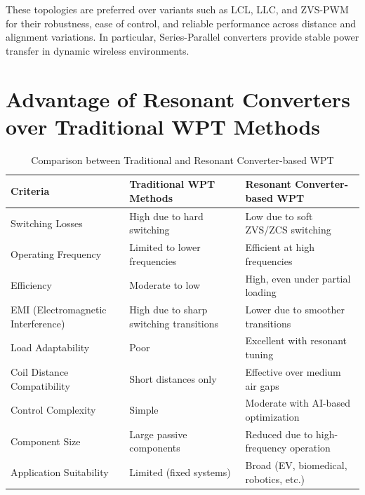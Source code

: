 \documentclass[12pt,a4paper]{report}
\begin{document}
These topologies are preferred over variants such as LCL, LLC, and ZVS-PWM for their robustness, ease of control, and reliable performance across distance and alignment variations. In particular, Series-Parallel converters provide stable power transfer in dynamic wireless environments.\cite{lin2021analysis}\cite{bertolini2021frequency}

\newpage
\section{Advantage of Resonant Converters over Traditional WPT Methods}

\begin{table}[H]
\centering
\renewcommand{\arraystretch}{1.3}
\begin{tabular}{|p{4.5cm}|p{4.5cm}|p{4.5cm}|}
\hline
\textbf{Criteria} & \textbf{Traditional WPT Methods} & \textbf{Resonant Converter-based WPT} \\
\hline
Switching Losses & High due to hard switching & Low due to soft ZVS/ZCS switching \\
\hline
Operating Frequency & Limited to lower frequencies & Efficient at high frequencies \\
\hline
Efficiency & Moderate to low & High, even under partial loading \\
\hline
EMI (Electromagnetic Interference) & High due to sharp switching transitions & Lower due to smoother transitions \\
\hline
Load Adaptability & Poor & Excellent with resonant tuning \\
\hline
Coil Distance Compatibility & Short distances only & Effective over medium air gaps \\
\hline
Control Complexity & Simple & Moderate with AI-based optimization \\
\hline
Component Size & Large passive components & Reduced due to high-frequency operation \\
\hline
Application Suitability & Limited (fixed systems) & Broad (EV, biomedical, robotics, etc.) \\
\hline
\end{tabular}
\caption{Comparison between Traditional and Resonant Converter-based WPT\cite{choi2020resonant}\cite{lin2021analysis}\cite{erickson2020resonant}\cite{irivennela2020wireless}}
\label{tab:comparison_WPT}
\end{table}


\end{document}
